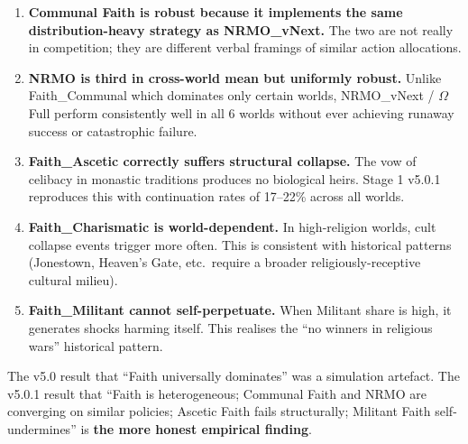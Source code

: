 \begin{enumerate}
\item \textbf{Communal Faith is robust because it implements the same
distribution-heavy strategy as NRMO\_vNext.} The two are not really in
competition; they are different verbal framings of similar action
allocations.

\item \textbf{NRMO is third in cross-world mean but uniformly robust.}
Unlike Faith\_Communal which dominates only certain worlds,
NRMO\_vNext / $\Omega$ Full perform consistently well in all 6 worlds
without ever achieving runaway success or catastrophic failure.

\item \textbf{Faith\_Ascetic correctly suffers structural collapse.}
The vow of celibacy in monastic traditions produces no biological
heirs. Stage 1 v5.0.1 reproduces this with continuation rates of
17--22\% across all worlds.

\item \textbf{Faith\_Charismatic is world-dependent.} In high-religion
worlds, cult collapse events trigger more often. This is consistent
with historical patterns (Jonestown, Heaven's Gate, etc.\ require a
broader religiously-receptive cultural milieu).

\item \textbf{Faith\_Militant cannot self-perpetuate.} When Militant
share is high, it generates shocks harming itself. This realises the
``no winners in religious wars'' historical pattern.
\end{enumerate}

The v5.0 result that ``Faith universally dominates'' was a
simulation artefact. The v5.0.1 result that ``Faith is heterogeneous;
Communal Faith and NRMO are converging on similar policies; Ascetic
Faith fails structurally; Militant Faith self-undermines'' is
\textbf{the more honest empirical finding}.

